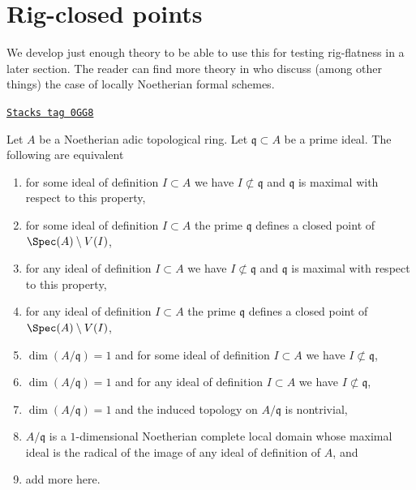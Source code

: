 \section{Rig-closed points}
\label{restricted-section-rig-points}
We develop just enough theory to be able to use this for testing
rig-flatness in a later section. The reader can find more theory
in \cite{BL-I} who discuss (among other things) the
case of locally Noetherian formal schemes.

\begin{lemma}
\label{restricted-lemma-rig-point}
\href{https://stacks.math.columbia.edu/tag/0GG8}{\texttt{Stacks tag 0GG8}}

Let $A$ be a Noetherian adic topological ring. Let
$\mathfrak q \subset A$ be a prime ideal. The following are
equivalent
\begin{enumerate}
\item for some ideal of definition $I \subset A$ we have
$I \not \subset \mathfrak q$ and $\mathfrak q$ is maximal
with respect to this property,
\item for some ideal of definition $I \subset A$ the prime
$\mathfrak q$ defines a closed point of $\Spec(A) \setminus V(I)$,
\item for any ideal of definition $I \subset A$ we have
$I \not \subset \mathfrak q$ and $\mathfrak q$ is maximal
with respect to this property,
\item for any ideal of definition $I \subset A$ the prime
$\mathfrak q$ defines a closed point of $\Spec(A) \setminus V(I)$,
\item $\dim(A/\mathfrak q) = 1$ and for some ideal of definition
$I \subset A$ we have $I \not \subset \mathfrak q$,
\item $\dim(A/\mathfrak q) = 1$ and for any ideal of definition
$I \subset A$ we have $I \not \subset \mathfrak q$,
\item $\dim(A/\mathfrak q) = 1$ and the induced topology
on $A/\mathfrak q$ is nontrivial,
\item $A/\mathfrak q$ is a $1$-dimensional Noetherian complete local domain
whose maximal ideal is the radical of the image of any ideal of
definition of $A$, and
\item add more here.
\end{enumerate}
\end{lemma}

